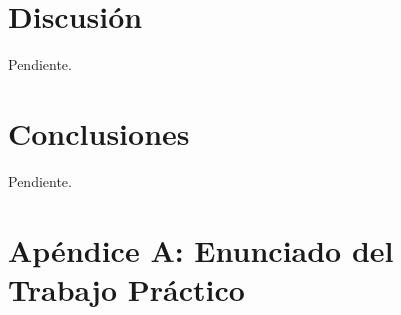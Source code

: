 \documentclass[a4paper,10pt,twoside]{article}
\begin{document}


\section{Discusión}
Pendiente.



\section{Conclusiones}
Pendiente.


\newpage

\section{Apéndice A: Enunciado del Trabajo Práctico}

\end{document}
